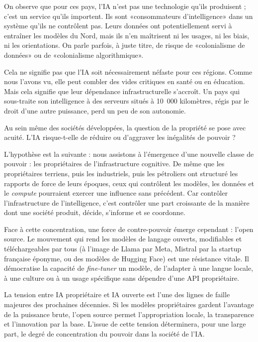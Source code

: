 On observe que pour ces pays, l'IA n'est pas une technologie qu'ils produisent ; c'est un service qu'ils importent. Ils sont «consommateurs d'intelligence» dans un système qu'ils ne contrôlent pas. Leurs données ont potentiellement servi à entraîner les modèles du Nord, mais ils n'en maîtrisent ni les usages, ni les biais, ni les orientations. On parle parfois, à juste titre, de risque de «colonialisme de données» ou de «colonialisme algorithmique».

Cela ne signifie pas que l'IA soit nécessairement néfaste pour ces régions. Comme nous l'avons vu, elle peut combler des vides critiques en santé ou en éducation. Mais cela signifie que leur dépendance infrastructurelle s'accroît. Un pays qui sous-traite son intelligence à des serveurs situés à 10~000 kilomètres, régis par le droit d'une autre puissance, perd un peu de son autonomie.

Au sein même des sociétés développées, la question de la propriété se pose avec acuité. L'IA risque-t-elle de réduire ou d'aggraver les inégalités de pouvoir ?

L'hypothèse est la suivante : nous assistons à l'émergence d'une nouvelle classe de pouvoir : les propriétaires de l'infrastructure cognitive. De même que les propriétaires terriens, puis les industriels, puis les pétroliers ont structuré les rapports de force de leurs époques, ceux qui contrôlent les modèles, les données et le \emph{compute} pourraient exercer une influence sans précédent. Car contrôler l'infrastructure de l'intelligence, c'est contrôler une part croissante de la manière dont une société produit, décide, s'informe et se coordonne.

Face à cette concentration, une force de contre-pouvoir émerge cependant : l'open source. Le mouvement qui rend les modèles de langage ouverts, modifiables et téléchargeables par tous (à l'image de Llama par Meta, Mistral par la startup française éponyme, ou des modèles de Hugging Face) est une résistance vitale. Il démocratise la capacité de \emph{fine-tuner} un modèle, de l'adapter à une langue locale, à une culture ou à un usage spécifique sans dépendre d'une API propriétaire.

La tension entre IA propriétaire et IA ouverte est l'une des lignes de faille majeures des prochaines décennies. Si les modèles propriétaires gardent l'avantage de la puissance brute, l'open source permet l'appropriation locale, la transparence et l'innovation par la base. L'issue de cette tension déterminera, pour une large part, le degré de concentration du pouvoir dans la société de l'IA.

